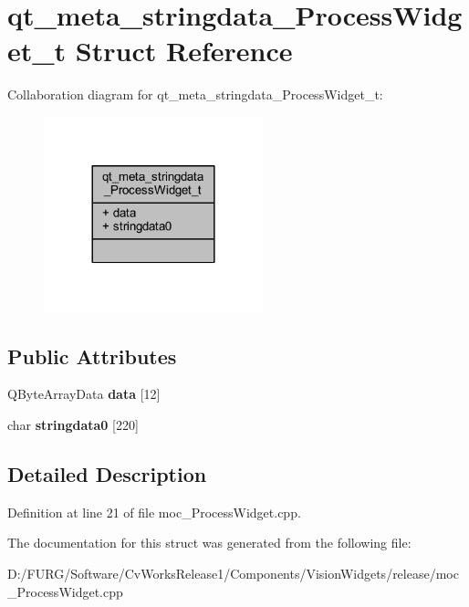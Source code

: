 \hypertarget{structqt__meta__stringdata___process_widget__t}{}\section{qt\+\_\+meta\+\_\+stringdata\+\_\+\+Process\+Widget\+\_\+t Struct Reference}
\label{structqt__meta__stringdata___process_widget__t}


Collaboration diagram for qt\+\_\+meta\+\_\+stringdata\+\_\+\+Process\+Widget\+\_\+t\+:
\nopagebreak
\begin{figure}[H]
\begin{center}
\leavevmode
\includegraphics[width=180pt]{structqt__meta__stringdata___process_widget__t__coll__graph}
\end{center}
\end{figure}
\subsection*{Public Attributes}
\begin{DoxyCompactItemize}
\item 
\hypertarget{structqt__meta__stringdata___process_widget__t_a3d7b95221b3652347060c202cc62d0f5}{}Q\+Byte\+Array\+Data {\bfseries data} \mbox{[}12\mbox{]}\label{structqt__meta__stringdata___process_widget__t_a3d7b95221b3652347060c202cc62d0f5}

\item 
\hypertarget{structqt__meta__stringdata___process_widget__t_adc1af54ea21b864f0dec4e50bba982b6}{}char {\bfseries stringdata0} \mbox{[}220\mbox{]}\label{structqt__meta__stringdata___process_widget__t_adc1af54ea21b864f0dec4e50bba982b6}

\end{DoxyCompactItemize}


\subsection{Detailed Description}


Definition at line 21 of file moc\+\_\+\+Process\+Widget.\+cpp.



The documentation for this struct was generated from the following file\+:\begin{DoxyCompactItemize}
\item 
D\+:/\+F\+U\+R\+G/\+Software/\+Cv\+Works\+Release1/\+Components/\+Vision\+Widgets/release/moc\+\_\+\+Process\+Widget.\+cpp\end{DoxyCompactItemize}
